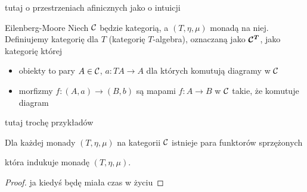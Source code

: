 tutaj o przestrzeniach afinicznych jako o intuicji

\begin{definition}{Eilenberg-Moore}{}
  Niech $\mathcal{C}$ będzie kategorią, a $(T,\eta,\mu)$ monadą na niej. Definiujemy kategorię  dla $T$ (kategorię $T$-algebra), oznaczaną jako $\boldsymbol{\mathcal{C}^T}$, jako kategorię której
  \begin{itemize}
    \item obiekty to pary $A\in\mathcal{C}$, $a:TA\to A$ dla których komutują diagramy w $\mathcal{C}$
      \begin{center}
      \end{center}
    \item {\color{red} morfizmy $f:(A, a)\to (B, b)$ są mapami $f:A\to B$ w $\mathcal{C}$ takie, że komutuje diagram }
      \begin{center}
      \end{center}
  \end{itemize}
\end{definition}

tutaj trochę przykładów

\begin{lemma}{}{}
  Dla każdej monady $(T,\eta, \mu)$ na kategorii $\mathcal{C}$ istnieje para funktorów sprzężonych 
  \begin{center}
  \end{center}
  która indukuje monadę $(T,\eta,\mu)$.
\end{lemma}

\begin{proof}
  ja kiedyś będę miała czas w życiu
\end{proof}


